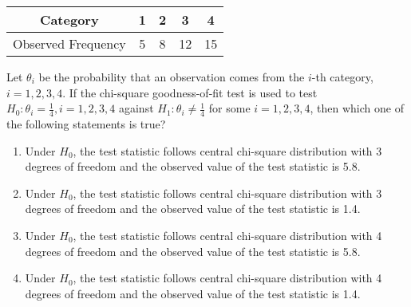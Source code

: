 \documentclass[journal]{IEEEtran}
\numberwithin{equation}{enumi}
\numberwithin{figure}{enumi}
\begin{document}
\begin{enumerate}
\begin{tabular}{|c|c|c|c|c|}
\hline
Category & 1 & 2 & 3 & 4 \\
\hline
Observed Frequency & 5 & 8 & 12 & 15 \\
\hline
\end{tabular}

Let $\theta_i$ be the probability that an observation comes from the $i$-th category, $i = 1, 2, 3, 4$. If the chi-square goodness-of-fit test is used to test $H_0: \theta_i = \frac{1}{4}, i = 1, 2, 3, 4$ against $H_1: \theta_i \neq \frac{1}{4}$ for some $i = 1, 2, 3, 4$, then which one of the following statements is true?

\begin{enumerate}
    \item Under $H_0$, the test statistic follows central chi-square distribution with 3 degrees of freedom and the observed value of the test statistic is 5.8.
    \item Under $H_0$, the test statistic follows central chi-square distribution with 3 degrees of freedom and the observed value of the test statistic is 1.4.
    \item Under $H_0$, the test statistic follows central chi-square distribution with 4 degrees of freedom and the observed value of the test statistic is 5.8.
    \item Under $H_0$, the test statistic follows central chi-square distribution with 4 degrees of freedom and the observed value of the test statistic is 1.4.
\end{enumerate}













\end{enumerate}
\end{document}
